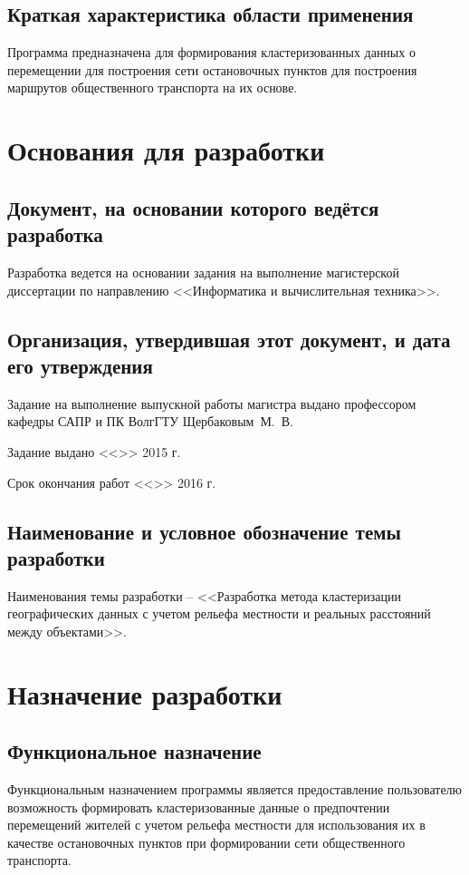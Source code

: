\section{Краткая характеристика области применения}
Программа предназначена для формирования кластеризованных данных о перемещении для построения сети остановочных пунктов для построения маршрутов общественного транспорта на их основе.

\chapter{Основания для разработки}
\section{Документ, на основании которого ведётся разработка}
Разработка ведется на основании задания на выполнение магистерской диссертации по направлению 
<<Информатика и вычислительная техника>>.

\section{Организация, утвердившая этот документ, и дата его утверждения}
Задание на выполнение выпускной работы магистра выдано профессором кафедры САПР и ПК ВолгГТУ Щербаковым~М.~В.

Задание выдано <<\LINE{1cm}>> \LINE{5cm} 2015 г.

Срок окончания работ <<\LINE{1cm}>> \LINE{5cm} 2016 г.

\section{Наименование и условное обозначение темы разработки}
Наименования темы разработки -- <<Разработка метода кластеризации географических данных с учетом рельефа местности и реальных расстояний между объектами>>.

\chapter{Назначение разработки}
\section{Функциональное назначение}
Функциональным назначением программы является предоставление пользователю возможность формировать кластеризованные данные о предпочтении перемещений жителей с учетом рельефа местности для использования их в качестве остановочных пунктов при формировании сети общественного транспорта.

